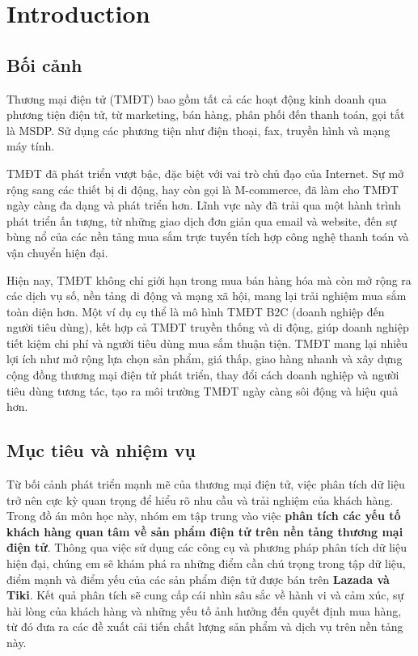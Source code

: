 \part{Introduction}

\chapter{Bối cảnh}

Thương mại điện tử (TMĐT) bao gồm tất cả các hoạt động kinh doanh qua phương tiện điện tử, từ marketing, bán hàng, phân phối đến thanh toán, gọi tắt là MSDP. Sử dụng các phương tiện như điện thoại, fax, truyền hình và mạng máy tính.

TMĐT đã phát triển vượt bậc, đặc biệt với vai trò chủ đạo của Internet. Sự mở rộng sang các thiết bị di động, hay còn gọi là M-commerce, đã làm cho TMĐT ngày càng đa dạng và phát triển hơn. Lĩnh vực này đã trải qua một hành trình phát triển ấn tượng, từ những giao dịch đơn giản qua email và website, đến sự bùng nổ của các nền tảng mua sắm trực tuyến tích hợp công nghệ thanh toán và vận chuyển hiện đại. 

Hiện nay, TMĐT không chỉ giới hạn trong mua bán hàng hóa mà còn mở rộng ra các dịch vụ số, nền tảng di động và mạng xã hội, mang lại trải nghiệm mua sắm toàn diện hơn. Một ví dụ cụ thể là mô hình TMĐT B2C (doanh nghiệp đến người tiêu dùng), kết hợp cả TMĐT truyền thống và di động, giúp doanh nghiệp tiết kiệm chi phí và người tiêu dùng mua sắm thuận tiện. TMĐT mang lại nhiều lợi ích như mở rộng lựa chọn sản phẩm, giá thấp, giao hàng nhanh và xây dựng cộng đồng thương mại điện tử phát triển, thay đổi cách doanh nghiệp và người tiêu dùng tương tác, tạo ra môi trường TMĐT ngày càng sôi động và hiệu quả hơn.

\chapter{Mục tiêu và nhiệm vụ}

Từ bối cảnh phát triển mạnh mẽ của thương mại điện tử, việc phân tích dữ liệu trở nên cực kỳ quan trọng để hiểu rõ nhu cầu và trải nghiệm của khách hàng. Trong đồ án môn học này, nhóm em tập trung vào việc \textbf{phân tích các yếu tố khách hàng quan tâm về sản phẩm điện tử trên nền tảng thương mại điện tử}. Thông qua việc sử dụng các công cụ và phương pháp phân tích dữ liệu hiện đại, chúng em sẽ khám phá ra những điểm cần chú trọng trong tập dữ liệu, điểm mạnh và điểm yếu của các sản phẩm điện tử được bán trên \textbf{Lazada và Tiki}. Kết quả phân tích sẽ cung cấp cái nhìn sâu sắc về hành vi và cảm xúc, sự hài lòng của khách hàng và những yếu tố ảnh hưởng đến quyết định mua hàng, từ đó đưa ra các đề xuất cải tiến chất lượng sản phẩm và dịch vụ trên nền tảng này.

